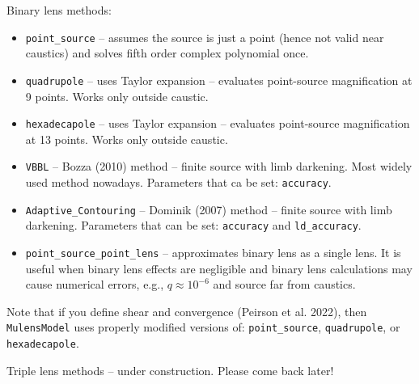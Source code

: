 \documentclass[12pt]{article}
\newcommand\MM{{\tt MulensModel}}
\begin{document}
\bigskip\bigskip
Binary lens methods:
\begin{itemize}
\item {\tt point\_source} -- assumes the source is just a point (hence not valid near caustics) and solves fifth order complex polynomial once.
\item {\tt quadrupole} -- uses Taylor expansion -- evaluates point-source magnification at 9 points.  Works only outside caustic.
\item {\tt hexadecapole} -- uses Taylor expansion -- evaluates point-source magnification at 13 points.  Works only outside caustic.
\item {\tt VBBL} -- Bozza (2010) method -- finite source with limb darkening.  Most widely used method nowadays.  Parameters that ca be set: {\tt accuracy}.
\item {\tt Adaptive\_Contouring} -- Dominik (2007) method -- finite source with limb darkening.  Parameters that can be set: {\tt accuracy} and {\tt ld\_accuracy}.
\item {\tt point\_source\_point\_lens} -- approximates binary lens as a single lens.  It is useful when binary lens effects are negligible and binary lens calculations may cause numerical errors, e.g., $q\approx10^{-6}$ and source far from caustics.  
\end{itemize}
Note that if you define shear and convergence (Peirson et al. 2022), then {\MM} uses properly modified versions of: {\tt point\_source}, {\tt quadrupole}, or {\tt hexadecapole}. 

\bigskip\bigskip
Triple lens methods -- under construction.  Please come back later!
\end{document}
